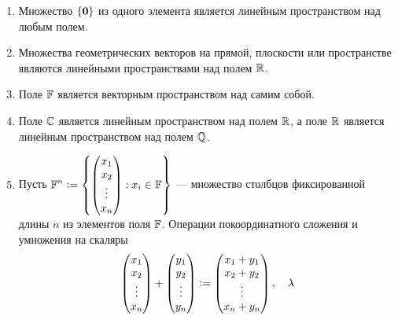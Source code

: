 \begin{example}
    \begin{enumerate}
        \item Множество $\{\boldsymbol{0}\}$ из одного элемента является линейным пространством над любым полем.
        \item Множества геометрических векторов на прямой, плоскости или пространстве являются линейными пространствами над полем $\mathbb{R}$.
        \item Поле $\mathbb{F}$ является векторным пространством над самим собой.
        \item Поле $\mathbb{C}$ является линейным пространством над полем $\mathbb{R}$, а поле $\mathbb{R}$ является линейным пространством над полем $\mathbb{Q}$.
        \item Пусть
            $\displaystyle
                \mathbb{F}^n \vcentcolon =
                \left\{
                    \begin{pmatrix}
                        x_1\\
                        x_2\\
                        \vdots\\
                        x_n
                    \end{pmatrix} : x_i \in \mathbb{F}
                \right\}
            $
            --- множество столбцов фиксированной длины $n$ из элементов поля $\mathbb{F}$. Операции покоординатного сложения и умножения на скаляры
            \[
                \begin{pmatrix}
                    x_1\\
                    x_2\\
                    \vdots\\
                    x_n
                \end{pmatrix} +
                \begin{pmatrix}
                    y_1\\
                    y_2\\
                    \vdots\\
                    y_n
                \end{pmatrix} \vcentcolon=
                \begin{pmatrix}
                    x_1 + y_1\\
                    x_2 + y_2\\
                    \vdots\\
                    x_n + y_n
                \end{pmatrix},\quad
                \lambda
\]
\end{enumerate}
\end{example}
